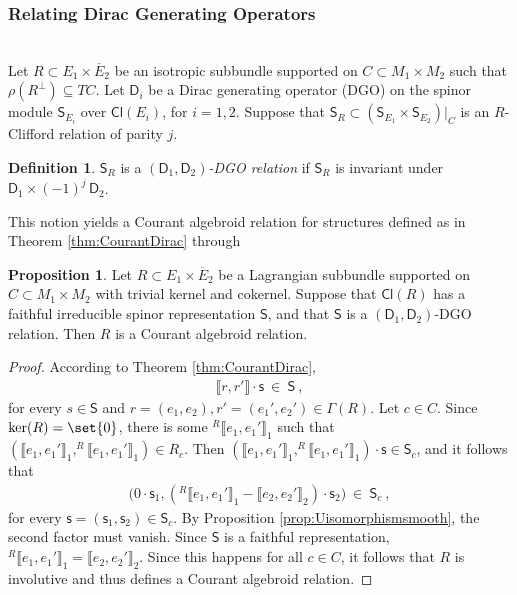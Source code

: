 \documentclass[a4paper, reqno, 11pt]{amsart}
\numberwithin{equation}{section}
\theoremstyle{definition}
\newtheorem{definition}[equation]{Definition}
\newtheorem{proposition}[equation]{Proposition}
\newcommand{\sfgamma}{\mathsf{\Gamma}}
\newcommand{\cbrak}[1]{\llbracket #1 \rrbracket}
\newcommand{\Cl}{\mathsf{Cl}}
\newcommand{\sfD}{{\mathsf{D}}}
\newcommand{\sfS}{{\mathsf{S}}}
\newcommand{\sfs}{{\mathsf{s}}}
\theoremstyle{remark}
\begin{document}
\medskip

\subsubsection{Relating Dirac Generating Operators}~\\[5pt]
Let $R \subset E_1 \times \overline{E}_2$ be an isotropic subbundle supported on $C\subset M_1\times M_2$ such that $\rho(R^\perp)\subseteq TC.$ Let $\sfD_i$ be a Dirac generating operator (DGO) on the spinor module $\sfS_{E_i}$  over $\Cl(E_i)$, for $i=1,2$. Suppose that $\sfS_R \subset (\sfS_{E_1} \times \sfS_{E_2}) \rvert_C$ is an $R$-Clifford relation of parity $j$.

\begin{definition}\label{def:DGOrelation}
    $\sfS_R$ is a \emph{$(\sfD_1,\sfD_2)$-DGO relation} if 
    $\sfS_R$ is invariant under $\sfD_1 \times  (-1)^j \, \sfD_2$. 
\end{definition}

This notion yields a Courant algebroid relation for structures defined  as in Theorem \ref{thm:CourantDirac}  through

\begin{proposition}\label{prop:DGOimpliesCArel}
  Let $R \subset E_1 \times \overline{E}_2$ be a Lagrangian subbundle supported on $C\subset M_1 \times M_2$ with trivial kernel and cokernel. Suppose that $\Cl(R)$ has a faithful irreducible spinor representation $\sfS$, and that $\sfS$ is a $(\sfD_1, \sfD_2)$-DGO relation. Then $R$ is a Courant algebroid relation.
\end{proposition}

\begin{proof}
 According to Theorem \ref{thm:CourantDirac}, 
\begin{align}
    \cbrak{r,r'} \cdot \sfs \ \in \ \sfS \ ,
\end{align}
for every $s \in \sfS$ and $r = (e_1, e_2), r' = (e_1',e_2') \in \sfgamma(R)$. Let $c \in C$.
Since $\ker(R)=\set{0}$, there is some $^R\cbrak{e_1,e_1'}_1$ such that $(\cbrak{e_1,e_1'}_1,^R\cbrak{e_1,e_1'}_1) \in R_c$. Then $(\cbrak{e_1,e_1'}_1,^R\cbrak{e_1,e_1'}_1) \cdot \sfs \in \sfS_c$, and it follows that
\begin{align}
   \big(0\cdot \sfs_1, (^R\cbrak{e_1, e_1'}_1 - \cbrak{e_2,e_2'}_2 )\cdot \sfs_2\big) \ \in \ \sfS_c \ ,
\end{align}
 for every $\sfs = (\sfs_1, \sfs_2) \in \sfS_c$.
By Proposition \ref{prop:Uisomorphismsmooth}, the second factor must vanish.
Since $\sfS$ is a faithful representation, $^R\cbrak{e_1, e_1'}_1 = \cbrak{e_2,e_2'}_2$. Since this happens for all $c\in C$, it follows that $R$ is involutive and thus defines a Courant algebroid relation.
\end{proof}
\end{document}
